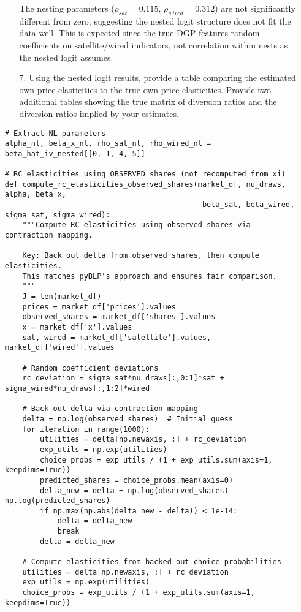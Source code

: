 \documentclass[english,11pt]{article}
\begin{document}
\begin{enumerate}
\begin{enumerate}
The nesting parameters ($\rho_{sat} = 0.115$, $\rho_{wired} = 0.312$) are not significantly different from zero, suggesting the nested logit structure does not fit the data well. This is expected since the true DGP features random coefficients on satellite/wired indicators, not correlation within nests as the nested logit assumes.

\item[7.] Using the nested logit results, provide a table comparing the
estimated own-price elasticities to the true own-price elasticities. Provide two
additional tables showing the true matrix of diversion ratios and the
diversion ratios implied by your estimates.
\end{enumerate}

\begin{verbatim}
# Extract NL parameters
alpha_nl, beta_x_nl, rho_sat_nl, rho_wired_nl = beta_hat_iv_nested[[0, 1, 4, 5]]

# RC elasticities using OBSERVED shares (not recomputed from xi)
def compute_rc_elasticities_observed_shares(market_df, nu_draws, alpha, beta_x, 
                                             beta_sat, beta_wired, sigma_sat, sigma_wired):
    """Compute RC elasticities using observed shares via contraction mapping.
    
    Key: Back out delta from observed shares, then compute elasticities.
    This matches pyBLP's approach and ensures fair comparison.
    """
    J = len(market_df)
    prices = market_df['prices'].values
    observed_shares = market_df['shares'].values
    x = market_df['x'].values
    sat, wired = market_df['satellite'].values, market_df['wired'].values
    
    # Random coefficient deviations
    rc_deviation = sigma_sat*nu_draws[:,0:1]*sat + sigma_wired*nu_draws[:,1:2]*wired
    
    # Back out delta via contraction mapping
    delta = np.log(observed_shares)  # Initial guess
    for iteration in range(1000):
        utilities = delta[np.newaxis, :] + rc_deviation
        exp_utils = np.exp(utilities)
        choice_probs = exp_utils / (1 + exp_utils.sum(axis=1, keepdims=True))
        predicted_shares = choice_probs.mean(axis=0)
        delta_new = delta + np.log(observed_shares) - np.log(predicted_shares)
        if np.max(np.abs(delta_new - delta)) < 1e-14:
            delta = delta_new
            break
        delta = delta_new
    
    # Compute elasticities from backed-out choice probabilities
    utilities = delta[np.newaxis, :] + rc_deviation
    exp_utils = np.exp(utilities)
    choice_probs = exp_utils / (1 + exp_utils.sum(axis=1, keepdims=True))
    

\end{verbatim}
\end{enumerate}
\end{document}
